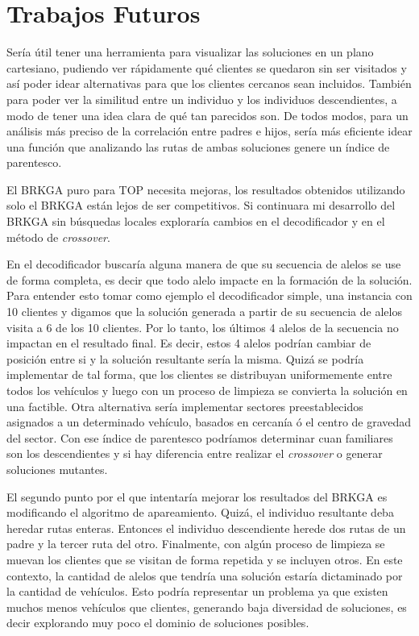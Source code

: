 \section{Trabajos Futuros}

Sería útil tener una herramienta para visualizar las soluciones en un plano cartesiano, pudiendo ver rápidamente qué clientes se quedaron sin ser visitados y así poder idear alternativas para que los clientes cercanos sean incluidos. También para poder ver la similitud entre un individuo y los individuos descendientes, a modo de tener una idea clara de qué tan parecidos son. De todos modos, para un análisis más preciso de la correlación entre padres e hijos, sería más eficiente idear una función que analizando las rutas de ambas soluciones genere un índice de parentesco.

\bigskip

El BRKGA puro para TOP necesita mejoras, los resultados obtenidos utilizando solo el BRKGA están lejos de ser competitivos. Si continuara mi desarrollo del BRKGA sin búsquedas locales exploraría cambios en el decodificador y en el método de \textit{crossover}. 

\bigskip

En el decodificador buscaría alguna manera de que su secuencia de alelos se use de forma completa, es decir que todo alelo impacte en la formación de la solución. Para entender esto tomar como ejemplo el decodificador simple, una instancia con 10 clientes y digamos que la solución generada a partir de su secuencia de alelos visita a 6 de los 10 clientes. Por lo tanto, los últimos 4 alelos de la secuencia no impactan en el resultado final. Es decir, estos 4 alelos podrían cambiar de posición entre si y la solución resultante sería la misma. Quizá se podría implementar de tal forma, que los clientes se distribuyan uniformemente entre todos los vehículos y luego con un proceso de limpieza se convierta la solución en una factible. Otra alternativa sería implementar sectores preestablecidos asignados a un determinado vehículo, basados en cercanía ó el centro de gravedad del sector. Con ese índice de parentesco podríamos determinar cuan familiares son los descendientes y si hay diferencia entre realizar el \textit{crossover} o generar soluciones mutantes.

\bigskip

El segundo punto por el que intentaría mejorar los resultados del BRKGA es modificando el algoritmo de apareamiento. Quizá, el individuo resultante deba heredar rutas enteras. Entonces el individuo descendiente herede dos rutas de un padre y la tercer ruta del otro. Finalmente, con algún proceso de limpieza se muevan los clientes que se visitan de forma repetida y se incluyen otros. En este contexto, la cantidad de alelos que tendría una solución estaría dictaminado por la cantidad de vehículos. Esto podría representar un problema ya que existen muchos menos vehículos que clientes, generando baja diversidad de soluciones, es decir explorando muy poco el dominio de soluciones posibles.

